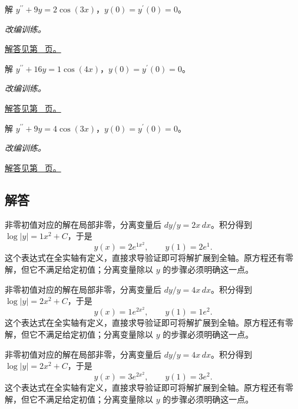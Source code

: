 \documentclass[12pt,fontset=fandol]{ctexart}
\begin{document}
\begin{example}[共振强迫振动]\label{ex:c23q22}
解 $y^{\prime\prime}+9y=2\cos(3x)$，$y(0)=y^{\prime}(0)=0$。
\par\textit{改编训练。}\par\hyperref[ans:c23q22]{解答见第~\pageref{ans:c23q22} 页。}
\end{example}
\begin{example}[共振强迫振动]\label{ex:c23q23}
解 $y^{\prime\prime}+16y=1\cos(4x)$，$y(0)=y^{\prime}(0)=0$。
\par\textit{改编训练。}\par\hyperref[ans:c23q23]{解答见第~\pageref{ans:c23q23} 页。}
\end{example}
\begin{example}[共振强迫振动]\label{ex:c23q24}
解 $y^{\prime\prime}+9y=4\cos(3x)$，$y(0)=y^{\prime}(0)=0$。
\par\textit{改编训练。}\par\hyperref[ans:c23q24]{解答见第~\pageref{ans:c23q24} 页。}
\end{example}
\subsection{解答}
\begin{solve}\label{ans:c23q1}
非零初值对应的解在局部非零，分离变量后 $dy/y=2x\,dx$。积分得到 $\log|y|=1x^2+C$，于是
\[
y(x)=2e^{1x^2},\qquad y(1)=2e^{1}.
\]
这个表达式在全实轴有定义，直接求导验证即可将解扩展到全轴。原方程还有零解，但它不满足给定初值；分离变量除以 $y$ 的步骤必须明确这一点。
\end{solve}

\begin{solve}\label{ans:c23q2}
非零初值对应的解在局部非零，分离变量后 $dy/y=4x\,dx$。积分得到 $\log|y|=2x^2+C$，于是
\[
y(x)=1e^{2x^2},\qquad y(1)=1e^{2}.
\]
这个表达式在全实轴有定义，直接求导验证即可将解扩展到全轴。原方程还有零解，但它不满足给定初值；分离变量除以 $y$ 的步骤必须明确这一点。
\end{solve}

\begin{solve}\label{ans:c23q3}
非零初值对应的解在局部非零，分离变量后 $dy/y=4x\,dx$。积分得到 $\log|y|=2x^2+C$，于是
\[
y(x)=3e^{2x^2},\qquad y(1)=3e^{2}.
\]
这个表达式在全实轴有定义，直接求导验证即可将解扩展到全轴。原方程还有零解，但它不满足给定初值；分离变量除以 $y$ 的步骤必须明确这一点。
\end{solve}
\end{document}
